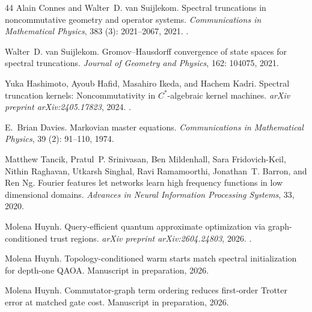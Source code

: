 \documentclass[11pt]{article}
\begin{document}
\begin{thebibliography}{44}
Alain Connes and Walter~D. van Suijlekom.
\newblock Spectral truncations in noncommutative geometry and operator systems.
\newblock \emph{Communications in Mathematical Physics}, 383
  (3): 2021--2067, 2021.
\newblock {}.

Walter~D. van Suijlekom.
\newblock Gromov--Hausdorff convergence of state spaces for spectral
  truncations.
\newblock \emph{Journal of Geometry and Physics}, 162: 104075, 2021.

Yuka Hashimoto, Ayoub Hafid, Masahiro Ikeda, and Hachem Kadri.
\newblock Spectral truncation kernels: Noncommutativity in
  ${C}^*$-algebraic kernel machines.
\newblock \emph{arXiv preprint arXiv:2405.17823}, 2024.
\newblock {}.

E.~Brian Davies.
\newblock Markovian master equations.
\newblock \emph{Communications in Mathematical Physics}, 39
  (2): 91--110, 1974.

Matthew Tancik, Pratul~P. Srinivasan, Ben Mildenhall, Sara Fridovich-Keil,
  Nithin Raghavan, Utkarsh Singhal, Ravi Ramamoorthi, Jonathan~T. Barron, and
  Ren Ng.
\newblock Fourier features let networks learn high frequency functions in low
  dimensional domains.
\newblock \emph{Advances in Neural Information Processing Systems}, 33, 2020.

Molena Huynh.
\newblock Query-efficient quantum approximate optimization via
  graph-conditioned trust regions.
\newblock \emph{arXiv preprint arXiv:2604.24803}, 2026.
\newblock {}.

Molena Huynh.
\newblock Topology-conditioned warm starts match spectral initialization for
  depth-one {QAOA}.
\newblock Manuscript in preparation, 2026.

Molena Huynh.
\newblock Commutator-graph term ordering reduces first-order {Trotter} error at
  matched gate cost.
\newblock Manuscript in preparation, 2026.


\end{thebibliography}
\end{document}
